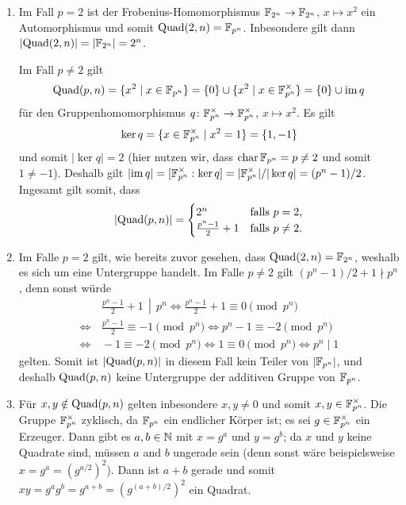 \begin{solution}
  \begin{enumerate}
    \item
      Im Fall $p = 2$ ist der Frobenius-Homomorphismus $\mathbb{F}_{2^n} \to \mathbb{F}_{2^n}$, $x \mapsto x^2$ ein Automorphismus und somit $\operatorname{Quad}(2,n) = \mathbb{F}_{p^n}$.
      Inbesondere gilt dann $|{\operatorname{Quad}(2,n)}| = |\mathbb{F}_{2^n}| = 2^n$.
      
      Im Fall $p \neq 2$ gilt
      \[
          \operatorname{Quad}(p,n)
        = \{ x^2 \mid x \in \mathbb{F}_{p^n} \}
        = \{0\} \cup \{x^2 \mid x \in \mathbb{F}_{p^n}^\times\}
        = \{0\} \cup \operatorname{im} q
      \]
      für den Gruppenhomomorphismus $q \colon \mathbb{F}_{p^n}^\times \to \mathbb{F}_{p^n}^\times$, $x \mapsto x^2$.
      Es gilt
      \[
          \ker q
        = \{x \in \mathbb{F}_{p^n}^\times \mid x^2 = 1\}
        = \{1,-1\}
      \]
      und somit $|{\ker q}| = 2$ (hier nutzen wir, dass $\operatorname{char} \mathbb{F}_{p^n} = p \neq 2$ und somit $1 \neq -1$).
      Deshalb gilt $|{\operatorname{im} q}| = [\mathbb{F}_{p^n}^\times : \ker q] = |\mathbb{F}_{p^n}^\times|/|\ker q| = (p^n - 1)/2$.
      Ingesamt gilt somit, dass
      \[
          |{\operatorname{Quad}(p,n)}| =
          \begin{cases}
            2^n                   & \text{falls $p = 2$},     \\
            \frac{p^n - 1}{2} + 1 & \text{falls $p \neq 2$}.
          \end{cases}
      \]
      
    \item
      Im Falle $p = 2$ gilt, wie bereits zuvor gesehen, dass $\operatorname{Quad}(2,n) = \mathbb{F}_{2^n}$, weshalb es sich um eine Untergruppe handelt.
      Im Falle $p \neq 2$ gilt $(p^n - 1)/2 + 1 \nmid p^n$, denn sonst würde
      \begin{align*}
            &\, \left. \frac{p^n - 1}{2} + 1 \,\middle|\, p^n \right.
        \iff    \frac{p^n - 1}{2} + 1 \equiv 0 \pmod{p^n}
        \\
        \iff&\, \frac{p^n - 1}{2} \equiv - 1 \pmod{p^n}
        \iff    p^n - 1 \equiv -2 \pmod{p^n}
        \\
        \iff&\, -1 \equiv -2 \pmod{p^n}
        \iff    1 \equiv 0  \pmod{p^n}
        \iff    p^n \mid 1
      \end{align*}
      gelten.
      Somit  ist $|{\operatorname{Quad}(p,n)}|$ in diesem Fall kein Teiler von $|\mathbb{F}_{p^n}|$, und deshalb $\operatorname{Quad}(p,n)$ keine Untergruppe der additiven Gruppe von $\mathbb{F}_{p^n}$.
      
    \item
      Für $x, y \notin \operatorname{Quad}(p,n)$ gelten inbesondere $x, y \neq 0$ und somit $x, y \in \mathbb{F}_{p^n}^\times$.
      Die Gruppe $\mathbb{F}_{p^n}^\times$ zyklisch, da $\mathbb{F}_{p^n}$ ein endlicher Körper ist;
      es sei $g \in \mathbb{F}_{p^n}^\times$ ein Erzeuger.
      Dann gibt es $a, b \in \mathbb{N}$ mit $x = g^a$ und $y = g^b$;
      da $x$ und $y$ keine Quadrate sind, müssen $a$ and $b$ ungerade sein (denn sonst wäre beispielsweise $x = g^a = (g^{a/2})^2$).
      Dann ist $a+b$ gerade und somit $xy = g^a g^b = g^{a+b} = (g^{(a+b)/2})^2$ ein Quadrat.
  \end{enumerate}
\end{solution}

